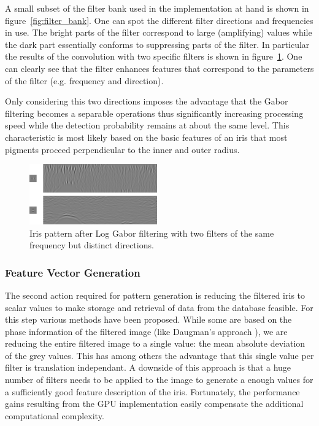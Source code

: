 \documentclass[journal]{IEEEtran}
\begin{document}
A small subset of the filter bank used in the implementation at hand is shown in figure~\ref{fig:filter_bank}. One can spot the different filter directions and frequencies in use. The bright parts of the filter correspond to large (amplifying) values while the dark part essentially conforms to suppressing parts of the filter. In particular the results of the convolution with two specific filters is shown in figure~\ref{fig:convolution_result}. One can clearly see that the filter enhances features that correspond to the parameters of the filter (e.g. frequency and direction).
\par Only considering this two directions imposes the advantage that the Gabor filtering becomes a separable operations thus significantly increasing processing speed while the detection probability remains at about the same level. This characteristic is most likely based on the basic features of an iris that most pigments proceed perpendicular to the inner and outer radius.

\begin{figure}[t]
	\centering
  \includegraphics[width=0.49\textwidth]{iris/pattern_gen.png}
	\caption{Iris pattern after Log Gabor filtering with two filters of the same frequency but distinct directions.}
	\label{fig:convolution_result}
\end{figure}


\subsubsection{Feature Vector Generation}
The second action required for pattern generation is reducing the filtered iris to scalar values to make storage and retrieval of data from the database feasible. For this step various methods have been proposed. While some are based on the phase information of the filtered image (like Daugman's approach \cite{daugman2004iris}), we are reducing the entire filtered image to a single value: the mean absolute deviation of the grey values. This has among others the advantage that this single value per filter is translation independant. A downside of this approach is that a huge number of filters needs to be applied to the image to generate a enough values for a sufficiently good feature description of the iris. Fortunately, the performance gains resulting from the GPU implementation easily compensate the additional computational complexity.
\end{document}
